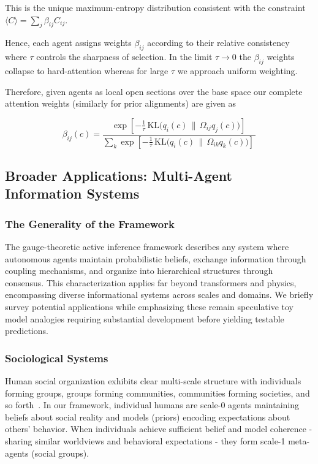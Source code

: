 \documentclass[11pt]{article}
\begin{document}
This is the unique maximum-entropy distribution consistent with the constraint $\langle C \rangle = \sum_j \beta_{ij} C_{ij}$.

Hence, each agent assigns weights $\beta_{ij}$ according to their relative consistency where $\tau$ controls the sharpness of selection. In the limit $\tau \rightarrow 0$ the $\beta_{ij}$ weights collapse to hard-attention whereas for large $\tau$ we approach uniform weighting.

Therefore, given agents as local open sections over the base space our complete attention weights (similarly for prior alignments) are given as

$$
\beta_{ij}(c) =
\frac{
  \exp\!\left[
    -\tfrac{1}{\tau}\,
    \mathrm{KL}\!\big(
      q_i(c)
      \,\big\|\,
      \Omega_{ij}q_j(c)
    \big)
  \right]
  \, 
}{
  \displaystyle
  \sum_{k}
  \exp\!\left[
    -\tfrac{1}{\tau}\,
    \mathrm{KL}\!\big(
      q_i(c)
      \,\big\|\,
      \Omega_{ik}q_k(c)
    \big)
  \right]
  \, 
}
$$

\subsection{Broader Applications: Multi-Agent Information Systems}

\subsubsection{The Generality of the Framework}

The gauge-theoretic active inference framework describes any system where autonomous agents maintain probabilistic beliefs, exchange information through coupling mechanisms, and organize into hierarchical structures through consensus. This characterization applies far beyond transformers and physics, encompassing diverse informational systems across scales and domains. We briefly survey potential applications while emphasizing these remain speculative toy model analogies requiring substantial development before yielding testable predictions.

\subsubsection{Sociological Systems}

Human social organization exhibits clear multi-scale structure with individuals forming groups, groups forming communities, communities forming societies, and so forth~\cite{Coleman1990,Watts1998}. In our framework, individual humans are scale-0 agents maintaining beliefs about social reality and models (priors) encoding expectations about others' behavior. When individuals achieve sufficient belief and model coherence - sharing similar worldviews and behavioral expectations - they form scale-1 meta-agents (social groups).
\end{document}
